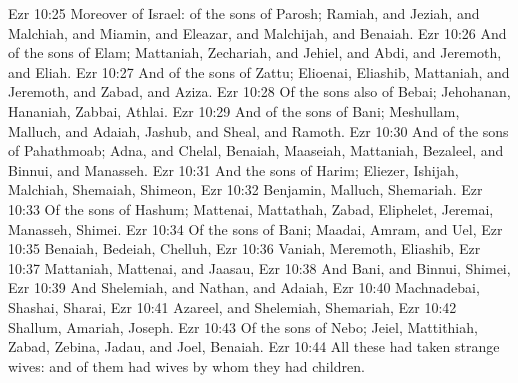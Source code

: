 \vs Ezr 10:25 Moreover of Israel: of the sons of Parosh; Ramiah, and Jeziah, and Malchiah, and Miamin, and Eleazar, and Malchijah, and Benaiah.
\vs Ezr 10:26 And of the sons of Elam; Mattaniah, Zechariah, and Jehiel, and Abdi, and Jeremoth, and Eliah.
\vs Ezr 10:27 And of the sons of Zattu; Elioenai, Eliashib, Mattaniah, and Jeremoth, and Zabad, and Aziza.
\vs Ezr 10:28 Of the sons also of Bebai; Jehohanan, Hananiah, Zabbai,  Athlai.
\vs Ezr 10:29 And of the sons of Bani; Meshullam, Malluch, and Adaiah, Jashub, and Sheal, and Ramoth.
\vs Ezr 10:30 And of the sons of Pahathmoab; Adna, and Chelal, Benaiah, Maaseiah, Mattaniah, Bezaleel, and Binnui, and Manasseh.
\vs Ezr 10:31 And  the sons of Harim; Eliezer, Ishijah, Malchiah, Shemaiah, Shimeon,
\vs Ezr 10:32 Benjamin, Malluch,  Shemariah.
\vs Ezr 10:33 Of the sons of Hashum; Mattenai, Mattathah, Zabad, Eliphelet, Jeremai, Manasseh,  Shimei.
\vs Ezr 10:34 Of the sons of Bani; Maadai, Amram, and Uel,
\vs Ezr 10:35 Benaiah, Bedeiah, Chelluh,
\vs Ezr 10:36 Vaniah, Meremoth, Eliashib,
\vs Ezr 10:37 Mattaniah, Mattenai, and Jaasau,
\vs Ezr 10:38 And Bani, and Binnui, Shimei,
\vs Ezr 10:39 And Shelemiah, and Nathan, and Adaiah,
\vs Ezr 10:40 Machnadebai, Shashai, Sharai,
\vs Ezr 10:41 Azareel, and Shelemiah, Shemariah,
\vs Ezr 10:42 Shallum, Amariah,  Joseph.
\vs Ezr 10:43 Of the sons of Nebo; Jeiel, Mattithiah, Zabad, Zebina, Jadau, and Joel, Benaiah.
\vs Ezr 10:44 All these had taken strange wives: and  of them had wives by whom they had children.
